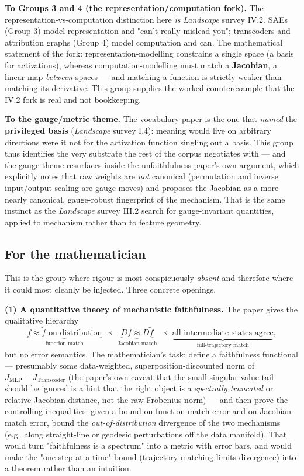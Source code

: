\textbf{To Groups 3 and 4 (the representation/computation fork).} The representation-vs-computation distinction here \emph{is} \emph{Landscape} survey IV.2. SAEs (Group 3) model representation and "can't really mislead you"; transcoders and attribution graphs (Group 4) model computation and can. The mathematical statement of the fork: representation-modelling constrains a single space (a basis for activations), whereas computation-modelling must match a \textbf{Jacobian}, a linear map \emph{between} spaces --- and matching a function is strictly weaker than matching its derivative. This group supplies the worked counterexample that the IV.2 fork is real and not bookkeeping.

\textbf{To the gauge/metric theme.} The vocabulary paper is the one that \emph{named} the \textbf{privileged basis} (\emph{Landscape} survey I.4): meaning would live on arbitrary directions were it not for the activation function singling out a basis. This group thus identifies the very substrate the rest of the corpus negotiates with --- and the gauge theme resurfaces inside the unfaithfulness paper's own argument, which explicitly notes that raw weights are \emph{not} canonical (permutation and inverse input/output scaling are gauge moves) and proposes the Jacobian as a more nearly canonical, gauge-robust fingerprint of the mechanism. That is the same instinct as the \emph{Landscape} survey III.2 search for gauge-invariant quantities, applied to mechanism rather than to feature geometry.


\subsection*{For the mathematician}

This is the group where rigour is most conspicuously \emph{absent} and therefore where it could most cleanly be injected. Three concrete openings.

\textbf{(1) A quantitative theory of mechanistic faithfulness.} The paper gives the qualitative hierarchy
\[
\underbrace{f \approx \tilde f \text{ on-distribution}}_{\text{function match}}
\;\prec\;
\underbrace{Df \approx D\tilde f}_{\text{Jacobian match}}
\;\prec\;
\underbrace{\text{all intermediate states agree}}_{\text{full-trajectory match}},
\]
but no error semantics. The mathematician's task: define a faithfulness functional --- presumably some data-weighted, superposition-discounted norm of $J_{\mathrm{MLP}} - J_{\mathrm{Transcoder}}$ (the paper's own caveat that the small-singular-value tail should be ignored is a hint that the right object is a \emph{spectrally truncated} or relative Jacobian distance, not the raw Frobenius norm) --- and then prove the controlling inequalities: given a bound on function-match error and on Jacobian-match error, bound the \emph{out-of-distribution} divergence of the two mechanisms (e.g.\ along straight-line or geodesic perturbations off the data manifold). That would turn "faithfulness is a spectrum" into a metric with error bars, and would make the "one step at a time" bound (trajectory-matching limits divergence) into a theorem rather than an intuition.

